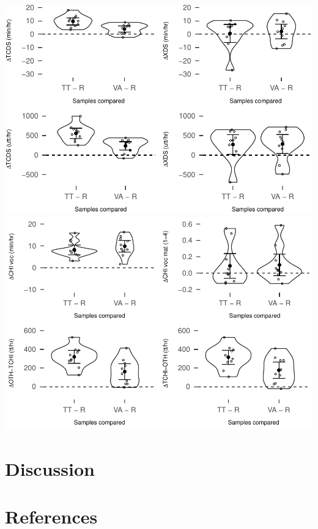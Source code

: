 \documentclass[man]{apa6}
\theoremstyle{definition}
\theoremstyle{definition}
\theoremstyle{definition}
\theoremstyle{remark}
\begin{document}
\includegraphics{Tseltal-CLE_files/figure-latex/plot_sample_differences-1.pdf}
\includegraphics{Tseltal-CLE_files/figure-latex/plot_sample_differences-2.pdf}

\section{Discussion}\label{discussion}

\newpage

\section{References}\label{references}

\begingroup
\setlength{\parindent}{-0.5in} \setlength{\leftskip}{0.5in}

\hypertarget{refs}{}

\endgroup
\end{document}

